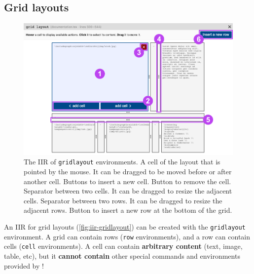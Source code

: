 \documentclass[11pt, a4paper]{article}
\begin{document}


\newpage
\subsection{Grid layouts}

\begin{figure}[h!]
    \centering
    \includegraphics[width = .95\textwidth]{img/iir-gridlayout.png}
    \caption{The IIR of \texttt{gridlayout} environments.  A cell of the layout that is pointed by the mouse. It can be dragged to be moved before or after another cell.  Buttons to insert a new cell.  Button to remove the cell.  Separator between two cells. It can be dragged to resize the adjacent cells.  Separator between two rows. It can be dragged to resize the adjacent rows.  Button to insert a new row at the bottom of the grid.}
    \label{fig:iir-gridlayout}
\end{figure}

An IIR for grid layouts (\autoref{fig:iir-gridlayout}) can be created with the \texttt{gridlayout} environment.
A grid can contain rows (\texttt{row} environments), and a row can contain cells (\texttt{cell} environments).
A cell can contain \textbf{arbitrary content} (text, image, table, etc), but it \textbf{cannot contain} other special commands and environments provided by \iLaTeX{}!
\end{document}
